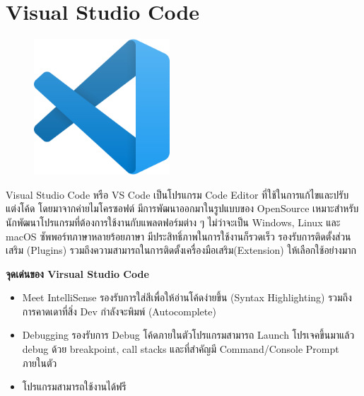 \section{Visual Studio Code}
\label{Visual Studio Code}
\begin{figure}[!thb]
	\captionsetup{justification=centering}
	\centering
	\includegraphics[width=2in]{latex/figures/vscode.png}
	\label{fig:vscode}
\end{figure}
Visual Studio Code หรือ  VS Code เป็นโปรแกรม  Code Editor ที่ใช้ในการแก้ไขและปรับแต่งโค้ด โดยมาจากค่ายไมโครซอฟต์ มีการพัฒนาออกมาในรูปแบบของ OpenSource เหมาะสำหรับนักพัฒนาโปรแกรมที่ต้องการใช้งานกับแพลตฟอร์มต่าง ๆ ไม่ว่าจะเป็น  Windows, Linux และ macOS   ซัพพอร์ทภาษาหลายร้อยภาษา มีประสิทธิ์ภาพในการใช้งานก็รวดเร็ว รองรับการติดตั้งส่วนเสริม (Plugins) รวมถึงความสามารถในการติดตั้งเครื่องมือเสริม(Extension) ให้เลือกใช้อย่างมาก 

\begin{flushleft}
	\textbf{จุดเด่นของ Virsual Studio Code}
\end{flushleft}
\begin{itemize}
	\item Meet IntelliSense รองรับการใส่สีเพื่อให้อ่านโค้ดง่ายขึ้น (Syntax Highlighting) รวมถึงการคาดเดาที่สิ่ง Dev กำลังจะพิมพ์ (Autocomplete)
	\item Debugging รองรับการ Debug โค้ดภายในตัวโปรแกรมสามารถ Launch โปรเจคขึ้นมาแล้ว debug ด้วย breakpoint, call stacks และที่สำคัญมี Command/Console Prompt ภายในตัว
	\item โปรแกรมสามารถใช้งานได้ฟรี
\end{itemize}
\newpage

